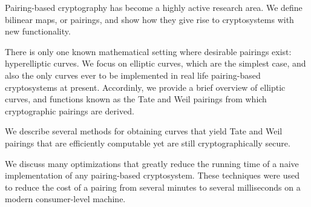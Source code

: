Pairing-based cryptography has become a highly active research area.
We define bilinear maps, or pairings, and show how they
give rise to cryptosystems with new functionality.

There is only one known mathematical setting where desirable
pairings exist: hyperelliptic curves. We focus on elliptic curves,
which are the simplest case, and also the only curves ever to be implemented
in real life pairing-based cryptosystems at present.
Accordinly,
we provide a brief overview of elliptic curves, and functions known as
the Tate and Weil pairings from which cryptographic pairings are derived.

We describe several methods for obtaining curves that yield Tate and Weil
pairings that are efficiently computable yet are still cryptographically
secure.

We discuss many optimizations that greatly reduce the running time
of a naive implementation of any pairing-based cryptosystem. These
techniques were used to reduce the
cost of a pairing from several minutes
to several milliseconds on a modern consumer-level machine.
